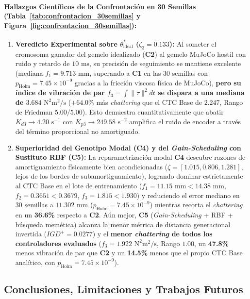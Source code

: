 \documentclass[11pt,a4paper]{article}
\begin{document}
\paragraph{Hallazgos Científicos de la Confrontación en 30 Semillas (Tabla~\ref{tab:confrontacion_30semillas} y Figura~\ref{fig:confrontacion_30semillas}):}
\begin{enumerate}
    \item \textbf{Veredicto Experimental sobre $\theta^*_{\text{ideal}}$ ($\zeta_3 = 0.133$):} Al someter el cromosoma ganador del gemelo idealizado (\textbf{C2}) al gemelo MuJoCo hostil con ruido y retardo de $10\text{ ms}$, su precisión de seguimiento se mantiene excelente (mediana $f_1 = 9.713\text{ mm}$, superando a \textbf{C1} en las 30 semillas con $p_{\text{Holm}} = 7.45 \times 10^{-9}$ gracias a la fricción viscosa física de MuJoCo), \textbf{pero su índice de vibración de par $f_3 = \int \|\dot{\tau}\|^2 dt$ se dispara a una mediana de $3.684\text{ N}^2\text{m}^2/\text{s}$} ($+64.0\%$ más \textit{chattering} que el CTC Base de $2.247$, Rango de Friedman $5.00/5.00$). Esto demuestra cuantitativamente que abatir $K_{d3} \to 4.20\text{ s}^{-1}$ con $K_{p3} \to 249.58\text{ s}^{-2}$ amplifica el ruido de encoder a través del término proporcional no amortiguado.
    \item \textbf{Superioridad del Genotipo Modal (\textbf{C4}) y del \textit{Gain-Scheduling} con Sustituto RBF (\textbf{C5}):} La reparametrización modal \textbf{C4} descubre razones de amortiguamiento físicamente bien acondicionadas ($\zeta = [1.015, 0.806, 1.281]$, lejos de los bordes de subamortiguamiento), logrando dominar estrictamente al CTC Base en el lote de entrenamiento ($f_1 = 11.15\text{ mm} < 14.38\text{ mm}$, $f_2 = 0.3651 < 0.3679$, $f_3 = 1.815 < 1.930$) y reduciendo el error mediano en 30 semillas a $11.302\text{ mm}$ ($p_{\text{Holm}} = 7.45 \times 10^{-9}$) mientras recorta el \textit{chattering} en un \textbf{36.6\%} respecto a \textbf{C2}. Aún mejor, \textbf{C5} (\textit{Gain-Scheduling} + RBF + búsqueda memética) alcanza la menor métrica de distancia generacional invertida ($IGD^+ = 0.0277$) y el \textbf{menor \textit{chattering} de todos los controladores evaluados} ($f_3 = 1.922\text{ N}^2\text{m}^2/\text{s}$, Rango $1.00$, un \textbf{47.8\%} menos vibración de par que \textbf{C2} y un \textbf{14.5\%} menos que el propio CTC Base analítico, con $p_{\text{Holm}} = 7.45 \times 10^{-9}$).
\end{enumerate}

\subsection{Conclusiones, Limitaciones y Trabajos Futuros}
\end{document}
